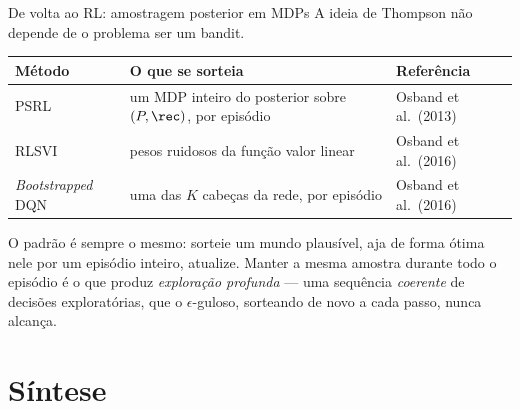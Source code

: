 \documentclass[aspectratio=169, 11pt]{beamer}
\begin{document}
\begin{frame}{De volta ao RL: amostragem posterior em MDPs}
  A ideia de Thompson não depende de o problema ser um bandit.

  \smallskip
  \begin{center}\scriptsize
  \begin{tabular}{@{}lp{5.4cm}l@{}}
    \toprule
    \textbf{Método} & \textbf{O que se sorteia} & \textbf{Referência} \\
    \midrule
    PSRL & um MDP inteiro do posterior sobre $(P, \rec)$, por episódio
         & Osband et al.\ (2013) \\
    RLSVI & pesos ruidosos da função valor linear & Osband et al.\ (2016) \\
    \emph{Bootstrapped} DQN & uma das $K$ cabeças da rede, por episódio
         & Osband et al.\ (2016) \\
    \bottomrule
  \end{tabular}
  \end{center}

  \medskip
  \begin{ideiabox}
    O padrão é sempre o mesmo: \alert{sorteie um mundo plausível, aja de
    forma ótima nele por um episódio inteiro, atualize}. Manter a mesma
    amostra durante todo o episódio é o que produz \emph{exploração
    profunda} — uma sequência \emph{coerente} de decisões exploratórias,
    que o $\epsilon$-guloso, sorteando de novo a cada passo, nunca alcança.
  \end{ideiabox}
\end{frame}

\section{Síntese}
\end{document}
